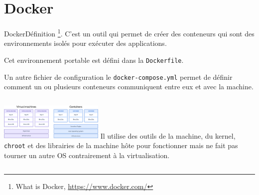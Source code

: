 \documentclass{beamer}
\begin{document}
    \section{Docker}\label{sec:docker}

    \begin{frame}{Docker}{Définition}
        \footnote{What is Docker, \url{https://www.docker.com/}}.
        \bigbreak
        C'est un outil qui permet de créer des conteneurs qui sont des environnements isolés pour exécuter des applications.

        Cet environnement portable est défini dans la \lstinline{Dockerfile}.

        Un autre fichier de configuration le \lstinline{docker-compose.yml} permet de définir comment un ou plusieurs conteneurs communiquent entre eux et avec la machine.
        \bigbreak
        \begin{columns}
            \centering
            \includegraphics[width=5cm]{image/docker-vs-vm}\footnotemark
            Il utilise des outils de la machine, du kernel, \lstinline{chroot} et des librairies de la machine hôte pour fonctionner mais ne fait pas tourner un autre OS contrairement à la virtualisation.
        \end{columns}
    \end{frame}
\end{document}
